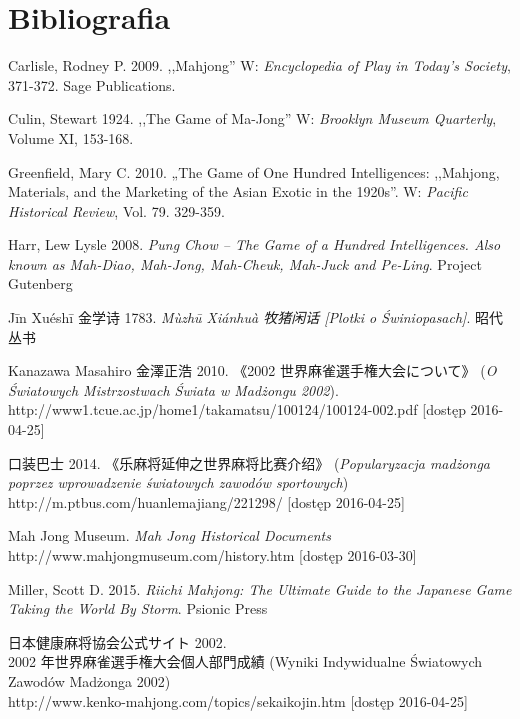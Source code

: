 \onecolumn
\section*{Bibliografia}
\setlength{\parindent}{0pt}
\setlength{\parskip}{1ex plus 0.5ex minus 0.2ex}
Carlisle, Rodney P. 2009. ,,Mahjong'' W: \textit{Encyclopedia of Play in Today's
Society}, 371-372.
Sage Publications.

Culin, Stewart 1924. ,,The Game of Ma-Jong'' W: \textit{Brooklyn Museum
Quarterly}, Volume XI, 153-168.


Greenfield, Mary C. 2010. „The Game of One Hundred Intelligences: ,,Mahjong,
Materials, and the Marketing of the Asian Exotic in the 1920s''. W:
\textit{Pacific Historical Review}, Vol. 79. 329-359.

Harr, Lew Lysle 2008. \textit{Pung Chow -- The Game of a Hundred Intelligences.
Also known as Mah-Diao, Mah-Jong, Mah-Cheuk, Mah-Juck and Pe-Ling}. Project
Gutenberg

Jīn Xuéshī 金学诗 1783. \textit{Mùzhū Xiánhuà 牧猪闲话 [Plotki o Świniopasach]}.
  昭代丛书

Kanazawa Masahiro 金澤正浩 2010.  《2002 世界麻雀選手権大会について》 (\textit{O Światowych Mistrzostwach
Świata w Madżongu 2002}).
\\http://www1.tcue.ac.jp/home1/takamatsu/100124/100124-002.pdf [dostęp
2016-04-25]

 口装巴士 2014.  《乐麻将延伸之世界麻将比赛介绍》
(\textit{Popularyzacja madżonga poprzez wprowadzenie światowych zawodów
sportowych}) \\http://m.ptbus.com/huanlemajiang/221298/ [dostęp 2016-04-25]

Mah Jong Museum. \textit{Mah Jong Historical Documents}
\\http://www.mahjongmuseum.com/history.htm [dostęp
2016-03-30]

Miller, Scott D. 2015. \textit{Riichi Mahjong: The Ultimate Guide to the
Japanese Game Taking the World By Storm}. Psionic Press

 日本健康麻将協会公式サイト  2002.
\\ 2002 年世界麻雀選手権大会個人部門成績 (Wyniki
Indywidualne Światowych Zawodów Madżonga 2002)
\\http://www.kenko-mahjong.com/topics/sekaikojin.htm [dostęp 2016-04-25]


